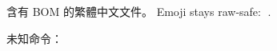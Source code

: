 ﻿\documentclass{article}
\begin{document}
含有 BOM 的繁體中文文件。 Emoji stays raw-safe: 🧭.

未知命令：
\end{document}
